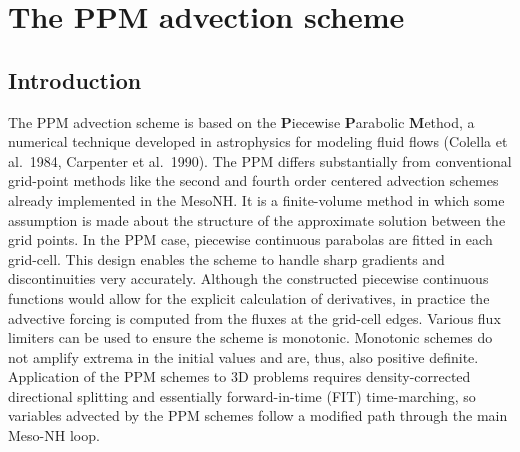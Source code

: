\section{The PPM advection scheme}

\subsection{Introduction}

  The PPM advection scheme is based on the \textbf{P}iecewise
  \textbf{P}arabolic \textbf{M}ethod, a numerical technique developed in
  astrophysics for modeling fluid flows (Colella et al.\ 1984, Carpenter
  et al.\ 1990). The PPM differs substantially from conventional
  grid-point methods like the second and fourth order centered advection
  schemes already implemented in the MesoNH. It is a finite-volume
  method in which some assumption is made about the structure of the
  approximate solution between the grid points.  In the PPM case,
  piecewise continuous parabolas are fitted in each grid-cell. This
  design enables the scheme to handle sharp gradients and
  discontinuities very accurately. Although the constructed piecewise
  continuous functions would allow for the explicit calculation of
  derivatives, in practice the advective forcing is computed from the
  fluxes at the grid-cell edges. Various flux limiters can be used to
  ensure the scheme is monotonic. Monotonic schemes do not amplify
  extrema in the initial values and are, thus, also positive
  definite. Application of the PPM schemes to 3D problems requires
  density-corrected directional splitting and essentially
  forward-in-time (FIT) time-marching, so variables advected by the PPM
  schemes follow a modified path through the main Meso-NH loop.

